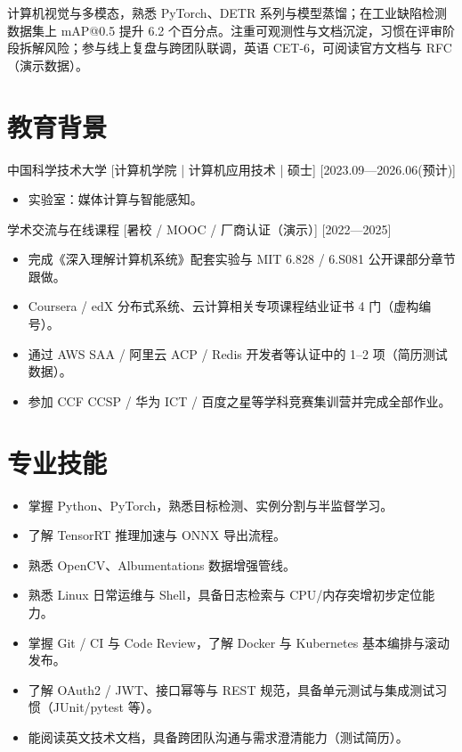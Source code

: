 \documentclass{resume-photo}
\begin{document}

\ResumeTitle

\noindent 计算机视觉与多模态，熟悉 PyTorch、DETR 系列与模型蒸馏；在工业缺陷检测数据集上 mAP@0.5 提升 6.2 个百分点。注重可观测性与文档沉淀，习惯在评审阶段拆解风险；参与线上复盘与跨团队联调，英语 CET-6，可阅读官方文档与 RFC（演示数据）。

\section{教育背景}
\ResumeItem
{中国科学技术大学}
[\textnormal{计算机学院 | 计算机应用技术 | 硕士}]
[2023.09—2026.06(预计)]

\begin{itemize}
  \item 实验室：媒体计算与智能感知。
\end{itemize}


\ResumeItem
{学术交流与在线课程}
[\textnormal{暑校 / MOOC / 厂商认证（演示）}]
[2022—2025]

\begin{itemize}
  \item 完成《深入理解计算机系统》配套实验与 MIT 6.828 / 6.S081 公开课部分章节跟做。
  \item Coursera / edX 分布式系统、云计算相关专项课程结业证书 4 门（虚构编号）。
  \item 通过 AWS SAA / 阿里云 ACP / Redis 开发者等认证中的 1--2 项（简历测试数据）。
  \item 参加 CCF CCSP / 华为 ICT / 百度之星等学科竞赛集训营并完成全部作业。
\end{itemize}



\section{专业技能}
\begin{itemize}
  \item 掌握 Python、PyTorch，熟悉目标检测、实例分割与半监督学习。
  \item 了解 TensorRT 推理加速与 ONNX 导出流程。
  \item 熟悉 OpenCV、Albumentations 数据增强管线。
  \item 熟悉 Linux 日常运维与 Shell，具备日志检索与 CPU/内存突增初步定位能力。
  \item 掌握 Git / CI 与 Code Review，了解 Docker 与 Kubernetes 基本编排与滚动发布。
  \item 了解 OAuth2 / JWT、接口幂等与 REST 规范，具备单元测试与集成测试习惯（JUnit/pytest 等）。
  \item 能阅读英文技术文档，具备跨团队沟通与需求澄清能力（测试简历）。
\end{itemize}
\end{document}
